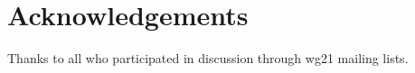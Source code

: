 \section*{Acknowledgements}

Thanks to all who participated in discussion through wg21 mailing lists.
